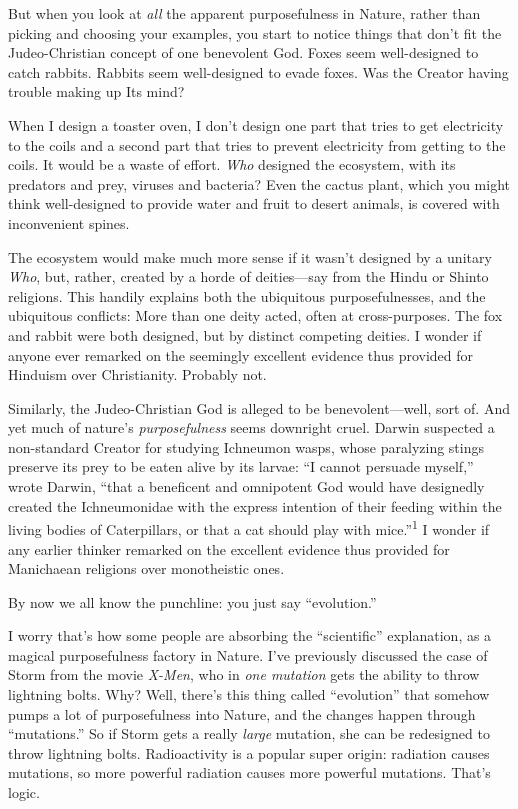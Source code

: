 {
 But when you look at \textit{all} the apparent purposefulness in
Nature, rather than picking and choosing your examples, you start to
notice things that don't fit the Judeo-Christian
concept of one benevolent God. Foxes seem well-designed to catch
rabbits. Rabbits seem well-designed to evade foxes. Was the Creator
having trouble making up Its mind?}

{
 When I design a toaster oven, I don't design one
part that tries to get electricity to the coils and a second part that
tries to prevent electricity from getting to the coils. It would be a
waste of effort. \textit{Who} designed the ecosystem, with its
predators and prey, viruses and bacteria? Even the cactus plant, which
you might think well-designed to provide water and fruit to desert
animals, is covered with inconvenient spines.}

{
 The ecosystem would make much more sense if it
wasn't designed by a unitary \textit{Who}, but, rather,
created by a horde of deities---say from the Hindu or Shinto religions.
This handily explains both the ubiquitous purposefulnesses, and the
ubiquitous conflicts: More than one deity acted, often at
cross-purposes. The fox and rabbit were both designed, but by distinct
competing deities. I wonder if anyone ever remarked on the seemingly
excellent evidence thus provided for Hinduism over Christianity.
Probably not.}

{
 Similarly, the Judeo-Christian God is alleged to be
benevolent---well, sort of. And yet much of nature's
\textit{purposefulness} seems downright cruel. Darwin suspected a
non-standard Creator for studying Ichneumon wasps, whose paralyzing
stings preserve its prey to be eaten alive by its larvae:
``I cannot persuade myself,'' wrote
Darwin, ``that a beneficent and omnipotent God would
have designedly created the Ichneumonidae with the express intention of
their feeding within the living bodies of Caterpillars, or that a cat
should play with mice.''\textsuperscript{1} I wonder
if any earlier thinker remarked on the excellent evidence thus provided
for Manichaean religions over monotheistic ones.}

{
 By now we all know the punchline: you just say
``evolution.''}

{
 I worry that's how some people are absorbing the
``scientific'' explanation, as a
magical purposefulness factory in Nature. I've
previously discussed the case of Storm from the movie \textit{X-Men},
who in \textit{one mutation} gets the ability to throw lightning bolts.
Why? Well, there's this thing called
``evolution'' that somehow pumps a
lot of purposefulness into Nature, and the changes happen through
``mutations.'' So if Storm gets a
really \textit{large} mutation, she can be redesigned to throw
lightning bolts. Radioactivity is a popular super origin: radiation
causes mutations, so more powerful radiation causes more powerful
mutations. That's logic.}

